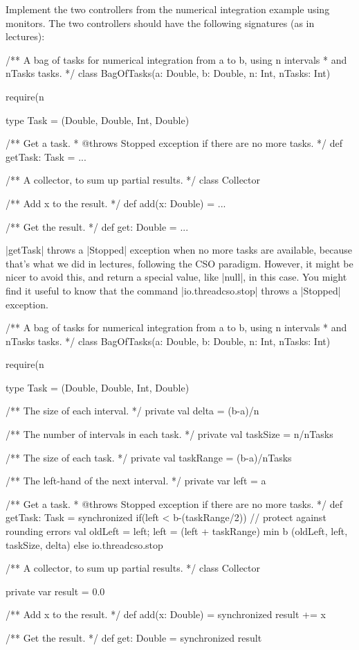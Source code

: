 \begin{question}
Implement the two controllers from the numerical integration example
using monitors.  The two controllers should have the following
signatures (as in lectures):
%
\begin{scala}
/** A bag of tasks for numerical integration from a to b, using n intervals 
  * and nTasks tasks. */
class BagOfTasks(a: Double, b: Double, n: Int, nTasks: Int){
  require(n%

  type Task = (Double, Double, Int, Double)

  /** Get a task.
    * @throws Stopped exception if there are no more tasks. */
  def getTask: Task = ...
}

/** A collector, to sum up partial results. */
class Collector{
  /** Add x to the result. */
  def add(x: Double) = ...

  /** Get the result. */
  def get: Double = ...
}
\end{scala}
%
|getTask| throws a |Stopped| exception when no more tasks are available,
because that's what we did in lectures, following the CSO paradigm.  However,
it might be nicer to avoid this, and return a special value, like |null|, in
this case.  You might find it useful to know that the command
|io.threadcso.stop| throws a |Stopped| exception.
\end{question}


\begin{answer}
\begin{scala}
/** A bag of tasks for numerical integration from a to b, using n intervals 
  * and nTasks tasks. */
class BagOfTasks(a: Double, b: Double, n: Int, nTasks: Int){
  require(n%

  type Task = (Double, Double, Int, Double)

  /** The size of each interval. */
  private val delta = (b-a)/n

  /** The number of intervals in each task. */
  private val taskSize = n/nTasks

  /** The size of each task. */
  private val taskRange = (b-a)/nTasks
  
  /** The left-hand of the next interval. */
  private var left = a

  /** Get a task.
    * @throws Stopped exception if there are no more tasks. */
  def getTask: Task = synchronized{
    if(left < b-(taskRange/2)){ // protect against rounding errors
      val oldLeft = left; left = (left + taskRange) min b
      (oldLeft, left, taskSize, delta)
    }
    else io.threadcso.stop
  }
}

/** A collector, to sum up partial results. */
class Collector{
  private var result = 0.0

  /** Add x to the result. */
  def add(x: Double) = synchronized{ result += x }

  /** Get the result. */
  def get: Double = synchronized{ result }
}
\end{scala}
\end{answer}
